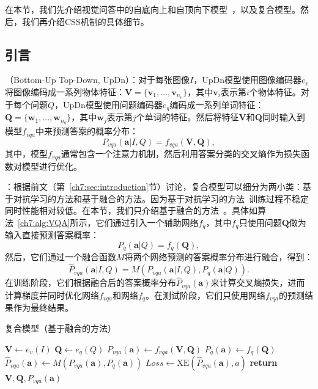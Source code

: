 在本节，我们先介绍视觉问答中的自底向上和自顶向下模型~\cite{anderson2018bottom}，以及复合模型。然后，我们再介绍CSS机制的具体细节。

\subsection{引言}

\textbf{}（Bottom-Up Top-Down, UpDn）：对于每张图像$I$，UpDn模型使用图像编码器$e_v$将图像编码成一系列物体特征：$\bm{V} = \{\bm{v}_1, ..., \bm{v}_{n_v}\}$，其中$\bm{v}_i$表示第$i$个物体特征。对于每个问题$Q$，UpDn模型使用问题编码器$e_q$编码成一系列单词特征：$\bm{Q} = \{\bm{w}_1, ..., \bm{w}_{n_q}\}$，其中$\bm{w}_j$表示第$j$个单词的特征。然后将特征$\bm{V}$和$\bm{Q}$同时输入到模型$f_{vqa}$中来预测答案的概率分布：
\begin{equation} \label{ch7:eq:p_vqa}
    P_{vqa}(\bm{a}|I, Q) = f_{vqa}(\bm{V}, \bm{Q}),
\end{equation}
其中，模型$f_{vqa}$通常包含一个注意力机制，然后利用答案分类的交叉熵作为损失函数对模型进行优化。

\textbf{}：根据前文（第~\ref{ch7:sec:introduction}节）讨论，复合模型可以细分为两小类：基于对抗学习的方法和基于融合的方法。因为基于对抗学习的方法~\cite{ramakrishnan2018overcoming,grand2019adversarial,belinkov2019don}训练过程不稳定同时性能相对较低。在本节，我们只介绍基于融合的方法~\cite{cadene2019rubi,clark2019don,mahabadi2019simple}。具体如算法~\ref{ch7:alg:VQA}所示，它们通过引入一个辅助网络$f_q$，其中$f_q$只使用问题$\bm{Q}$做为输入直接预测答案概率：
\begin{equation}
P_{q}(\bm{a}|Q) = f_{q}(\bm{Q}),
\end{equation}
然后，它们通过一个融合函数$M$将两个网络预测的答案概率分布进行融合，得到：
\begin{equation}
\hat{P}_{vqa}(\bm{a}|I, Q) = M(P_{vqa}(\bm{a}|I, Q), P_{q}(\bm{a}|Q)).
\end{equation}
在训练阶段，它们根据融合后的答案概率分布$\hat{P}_{vqa}(\bm{a})$来计算交叉熵损失，进而计算梯度并同时优化网络$f_{vqa}$和网络$f_q$。在测试阶段，它们只使用网络$f_{vqa}$的预测结果作为最终结果。

\begin{algorithm}[t]
    \caption{复合模型（基于融合的方法）}\label{ch7:alg:VQA}
    \begin{algorithmic}[1]
        \State $ \bm{V} \leftarrow e_v(I) $
        \State $ \bm{Q} \leftarrow e_q(Q) $
        \State $ P_{vqa}(\bm{a}) \leftarrow f_{vqa}(\bm{V}, \bm{Q}) $
        \State $ P_{q}(\bm{a}) \leftarrow f_{q}(\bm{Q})$      
        \State $ \hat{P}_{vqa}(\bm{a}) \leftarrow M(P_{vqa}(\bm{a}), P_{q}(\bm{a}))  $
        \State $ Loss \leftarrow \text{XE}(\hat{P}_{vqa}(\bm{a}), a)$ 
        \State \textbf{return} $\bm{V}, \bm{Q}, P_{vqa}(\bm{a})$
        \EndIf 
        \EndFunction
    \end{algorithmic}
\end{algorithm}

